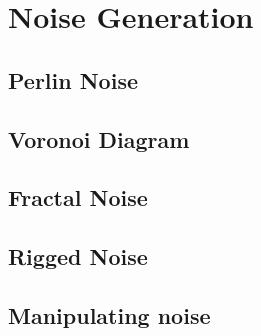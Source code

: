 \chapter{Noise Generation}
\label{NoiseGen}
\section{Perlin Noise}

\section{Voronoi Diagram}

\section{Fractal Noise}

\section{Rigged Noise}

\section{Manipulating noise}